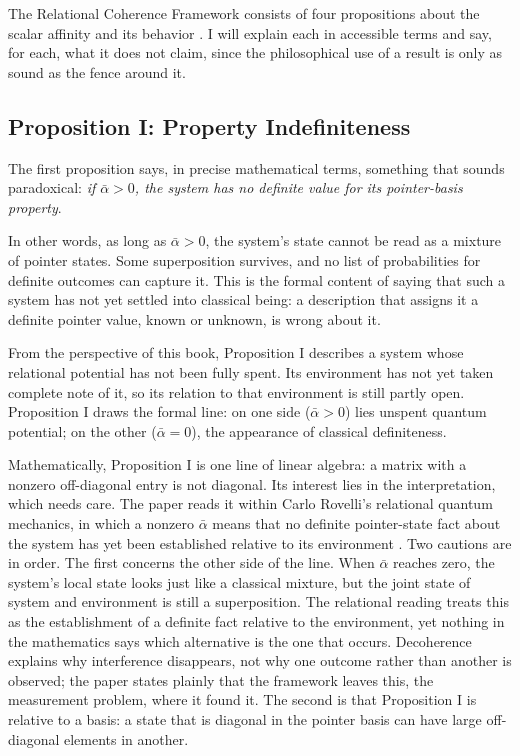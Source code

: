 The Relational Coherence Framework consists of four propositions about the scalar affinity and its behavior \citep{AdamsRCT}. I will explain each in accessible terms and say, for each, what it does not claim, since the philosophical use of a result is only as sound as the fence around it.

\subsection*{Proposition I: Property Indefiniteness}

The first proposition says, in precise mathematical terms, something that sounds paradoxical: \emph{if $\bar{\alpha} > 0$, the system has no definite value for its pointer-basis property}.

In other words, as long as $\bar{\alpha} > 0$, the system's state cannot be read as a mixture of pointer states. Some superposition survives, and no list of probabilities for definite outcomes can capture it. This is the formal content of saying that such a system has not yet settled into classical being: a description that assigns it a definite pointer value, known or unknown, is wrong about it.

From the perspective of this book, Proposition I describes a system whose relational potential has not been fully spent. Its environment has not yet taken complete note of it, so its relation to that environment is still partly open. Proposition I draws the formal line: on one side ($\bar{\alpha} > 0$) lies unspent quantum potential; on the other ($\bar{\alpha} = 0$), the appearance of classical definiteness.

Mathematically, Proposition I is one line of linear algebra: a matrix with a nonzero off-diagonal entry is not diagonal. Its interest lies in the interpretation, which needs care. The paper reads it within Carlo Rovelli's relational quantum mechanics, in which a nonzero $\bar{\alpha}$ means that no definite pointer-state fact about the system has yet been established relative to its environment \citep{Rovelli1996, AdamsRCT}. Two cautions are in order. The first concerns the other side of the line. When $\bar{\alpha}$ reaches zero, the system's local state looks just like a classical mixture, but the joint state of system and environment is still a superposition. The relational reading treats this as the establishment of a definite fact relative to the environment, yet nothing in the mathematics says which alternative is the one that occurs. Decoherence explains why interference disappears, not why one outcome rather than another is observed; the paper states plainly that the framework leaves this, the measurement problem, where it found it. The second is that Proposition I is relative to a basis: a state that is diagonal in the pointer basis can have large off-diagonal elements in another.

